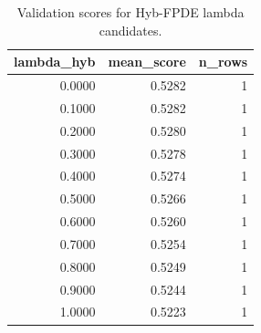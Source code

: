 \begin{table}[t]
\caption{Validation scores for Hyb-FPDE lambda candidates.}
\label{tab:lambda_distribution_computed}
\centering
\begin{tabular}{rrr}
\toprule
lambda\_hyb & mean\_score & n\_rows \\
\midrule
0.0000 & 0.5282 & 1 \\
0.1000 & 0.5282 & 1 \\
0.2000 & 0.5280 & 1 \\
0.3000 & 0.5278 & 1 \\
0.4000 & 0.5274 & 1 \\
0.5000 & 0.5266 & 1 \\
0.6000 & 0.5260 & 1 \\
0.7000 & 0.5254 & 1 \\
0.8000 & 0.5249 & 1 \\
0.9000 & 0.5244 & 1 \\
1.0000 & 0.5223 & 1 \\
\bottomrule
\end{tabular}

\end{table}
